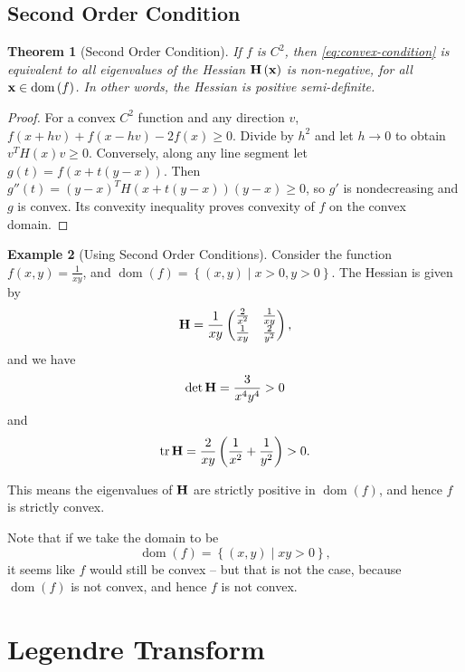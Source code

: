 \documentclass[11pt]{article}
\numberwithin{equation}{section}
\newtheorem{theorem}{Theorem}[section]
\theoremstyle{definition}
\newtheorem{example}[theorem]{Example}
\theoremstyle{remark}
\newcommand{\pqty}[1]{\left(#1\right)}
\newcommand{\flatfrac}[2]{\frac{#1}{#2}}
\newcommand{\set}[2]{\left\{#1\mid #2\right\}}
\newcommand{\pmqty}[1]{\begin{pmatrix}#1\end{pmatrix}}
\newcommand{\contClass}[1]{C^{#1}}
\DeclareMathOperator{\dom}{dom}
\DeclareMathOperator{\tr}{tr}
\begin{document}
\subsection{Second Order Condition}

\begin{theorem}[Second Order Condition]\label{variation-unit-0015}
    \label{thm:second-order-condition}%
    If \(f\) is \(\contClass{2}\), then \autoref{eq:convex-condition} is equivalent to all eigenvalues of the Hessian \(\vb{H} \pqty{\vb{x}}\) is non-negative, for all \(\vb{x} \in \dom\pqty{f}\). In other words, the Hessian is positive semi-definite.
\end{theorem}

\begin{proof}
For a convex \(C^2\) function and any direction \(v\),
\(f(x+hv)+f(x-hv)-2f(x)\ge0\). Divide by \(h^2\) and let \(h\to0\)
to obtain \(v^TH(x)v\ge0\). Conversely, along any line segment let
\(g(t)=f(x+t(y-x))\). Then \(g''(t)=(y-x)^TH(x+t(y-x))(y-x)\ge0\),
so \(g'\) is nondecreasing and \(g\) is convex. Its convexity inequality proves
convexity of \(f\) on the convex domain.
\end{proof}

\begin{example}[Using Second Order Conditions]\label{variation-unit-0016}
    Consider the function \(f\pqty{x, y} = \flatfrac{1}{xy}\), and \(\dom\pqty{f} = \set{\pqty{x, y}}{x > 0, y > 0}\). The Hessian is given by
    \[
        \vb{H} = \frac{1}{xy} \pmqty{\frac{2}{x^2} & \frac{1}{xy} \\ \frac{1}{xy} & \frac{2}{y^2}},
    \]
    and we have
    \[
        \det \vb{H} = \frac{3}{x^4 y^4} > 0
    \]
    and
    \[
        \tr \vb{H} = \frac{2}{xy} \pqty{\frac{1}{x^2} + \frac{1}{y^2}} > 0.
    \]

    This means the eigenvalues of \(\vb{H}\) are strictly positive in \(\dom\pqty{f}\), and hence \(f\) is strictly convex.

    Note that if we take the domain to be
    \[
        \dom\pqty{f} = \set{\pqty{x, y}}{xy > 0},
    \]
    it seems like \(f\) would still be convex -- but that is not the case, because \(\dom \pqty{f}\) is not convex, and hence \(f\) is not convex.
\end{example}

\section{Legendre Transform}
\end{document}
